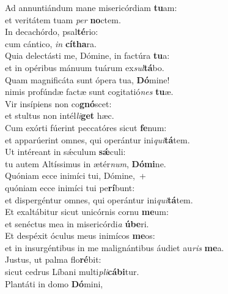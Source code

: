 \evenverse Ad annuntiándum mane misericórdiam \textbf{tu}am:~\*\\
\evenverse et veritátem tuam \textit{per} \textbf{no}ctem.\\
\oddverse In decachórdo, psal\textbf{té}rio:~\*\\
\oddverse cum cántico, \textit{in} \textbf{cí}\textbf{tha}ra.\\
\evenverse Quia delectásti me, Dómine, in factúra \textbf{tu}a:~\*\\
\evenverse et in opéribus mánuum tuárum ex\textit{sul}\textbf{tá}bo.\\
\oddverse Quam magnificáta sunt ópera tua, \textbf{Dó}mine!~\*\\
\oddverse nimis profúndæ factæ sunt cogitatió\textit{nes} \textbf{tu}æ.\\
\evenverse Vir insípiens non co\textbf{gnó}scet:~\*\\
\evenverse et stultus non intél\textit{li}\textbf{get} hæc.\\
\oddverse Cum exórti fúerint peccatóres sicut \textbf{fe}num:~\*\\
\oddverse et apparúerint omnes, qui operántur ini\textit{qui}\textbf{tá}tem.\\
\evenverse Ut intéreant in sǽculum \textbf{sǽ}culi:~\*\\
\evenverse tu autem Altíssimus in ætér\textit{num}, \textbf{Dó}\textbf{mi}ne.\\
\oddverse Quóniam ecce inimíci tui, Dómine,~+\\
\oddverse  quóniam ecce inimíci tui pe\textbf{rí}bunt:~\*\\
\oddverse et dispergéntur omnes, qui operántur ini\textit{qui}\textbf{tá}tem.\\
\evenverse Et exaltábitur sicut unicórnis cornu \textbf{me}um:~\*\\
\evenverse et senéctus mea in misericórdi\textit{a} \textbf{ú}\textbf{be}ri.\\
\oddverse Et despéxit óculus meus inimícos \textbf{me}os:~\*\\
\oddverse et in insurgéntibus in me malignántibus áudiet au\textit{ris} \textbf{me}a.\\
\evenverse Justus, ut palma flo\textbf{ré}bit:~\*\\
\evenverse sicut cedrus Líbani multi\textit{pli}\textbf{cá}\textbf{bi}tur.\\
\oddverse Plantáti in domo \textbf{Dó}mini,~\*\\
